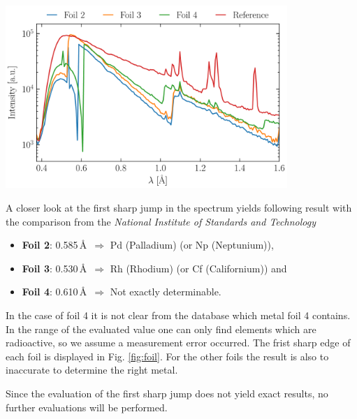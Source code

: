 \begin{center}
    \captionsetup{type = figure}
    \includegraphics[width = 0.8\textwidth]{Pictures/Evaluation/41/XRay-Spectrum.pdf}
    \label{fig:xRay}
\end{center}

A closer look at the first sharp jump in the spectrum yields following result with the comparison from the \textit{National Institute of Standards and Technology}\cite{XRayDatabase}
\begin{itemize}
    \item \textbf{Foil 2}: 0.585\,\AA~$\Rightarrow$ Pd (Palladium) (or Np (Neptunium)),
    \item \textbf{Foil 3}: 0.530\,\AA~$\Rightarrow$ Rh (Rhodium) (or Cf (Californium)) and
    \item \textbf{Foil 4}: 0.610\,\AA~$\Rightarrow$ Not exactly determinable.
\end{itemize}
In the case of foil 4 it is not clear from the database which metal foil 4 contains. In the range of the evaluated value one can only find elements which are radioactive, so we assume a measurement error occurred. The frist sharp edge of each foil is displayed in Fig. \ref{fig:foil}. For the other foils the result is also to inaccurate to determine the right metal. 
\bigskip

Since the evaluation of the first sharp jump does not yield exact results, no further evaluations will be performed.

